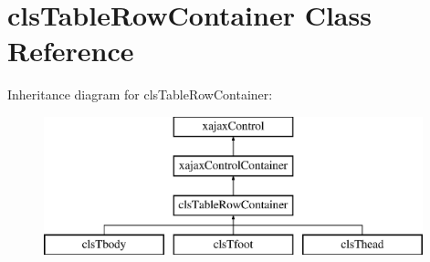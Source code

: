 \hypertarget{classclsTableRowContainer}{
\section{clsTableRowContainer Class Reference}
\label{classclsTableRowContainer}
}
Inheritance diagram for clsTableRowContainer:\begin{figure}[H]
\begin{center}
\leavevmode
\includegraphics[height=4.000000cm]{classclsTableRowContainer}
\end{center}
\end{figure}
